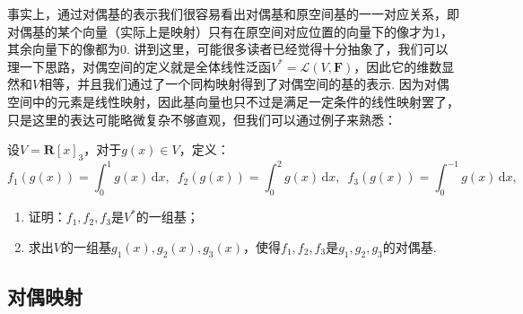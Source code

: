 事实上，通过对偶基的表示我们很容易看出对偶基和原空间基的一一对应关系，即对偶基的某个向量（实际上是映射）只有在原空间对应位置的向量下的像才为1，其余向量下的像都为0. 讲到这里，可能很多读者已经觉得十分抽象了，我们可以理一下思路，对偶空间的定义就是全体线性泛函$V^*=\mathcal{L}(V,\mathbf{F})$，因此它的维数显然和$V$相等，并且我们通过了一个同构映射得到了对偶空间的基的表示. 因为对偶空间中的元素是线性映射，因此基向量也只不过是满足一定条件的线性映射罢了，只是这里的表达可能略微复杂不够直观，但我们可以通过例子来熟悉：
\begin{example}
    设$V=\mathbf{R}[x]_3$，对于$g(x)\in V$，定义：
    \[f_1(g(x))=\displaystyle\int_0^1g(x)\,\mathrm{d}x,\enspace f_2(g(x))=\int_0^2g(x)\,\mathrm{d}x,\enspace f_3(g(x))=\int_0^{-1}g(x)\,\mathrm{d}x,\]
    \begin{enumerate}
        \item 证明：$f_1,f_2,f_3$是$V^*$的一组基；

        \item 求出$V$的一组基$g_1(x),g_2(x),g_3(x)$，使得$f_1,f_2,f_3$是$g_1,g_2,g_3$的对偶基.
    \end{enumerate}
\end{example}

\begin{solution}

\end{solution}

\subsection{对偶映射}

